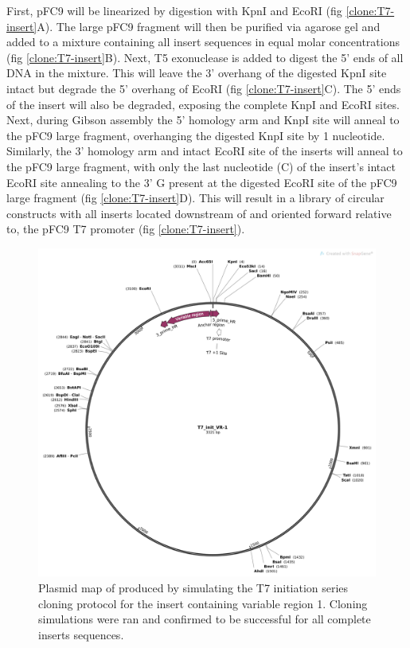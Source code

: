 \documentclass[11pt]{article}
\begin{document}
First, pFC9 will be linearized by digestion with KpnI and EcoRI  (fig \ref{clone:T7-insert}A). The large pFC9 fragment will then be purified via agarose gel and added to a mixture containing all insert sequences in equal molar concentrations (fig \ref{clone:T7-insert}B). Next, T5 exonuclease is added to digest the 5' ends of all DNA in the mixture. This will leave the 3' overhang of the digested KpnI site intact but degrade the 5' overhang of EcoRI  (fig \ref{clone:T7-insert}C). The 5' ends of the insert will also be degraded, exposing the complete KnpI and EcoRI sites. Next, during Gibson assembly the 5' homology arm and KnpI site will anneal to the pFC9 large fragment, overhanging the digested KnpI site by 1 nucleotide. Similarly, the 3' homology arm and intact EcoRI site of the inserts will anneal to the pFC9 large fragment, with only the last nucleotide (C) of the insert's intact EcoRI site annealing to the 3' G present at the digested EcoRI site of the pFC9 large fragment (fig \ref{clone:T7-insert}D). This will result in a library of circular constructs with all inserts located downstream of and oriented forward relative to, the pFC9 T7 promoter (fig \ref{clone:T7-insert}). 

\begin{figure}[H]
	\includegraphics[width=12cm]{images/plasmid_maps/T7_init_vr-1_simulated_assembly.png}
	\centering
	\caption{Plasmid map of produced by simulating the T7 initiation series cloning protocol for the insert containing variable region 1. Cloning simulations were ran and confirmed to be successful for all complete inserts sequences.}
	\label{clone:T7-insert-simulated}
\end{figure}
\end{document}
